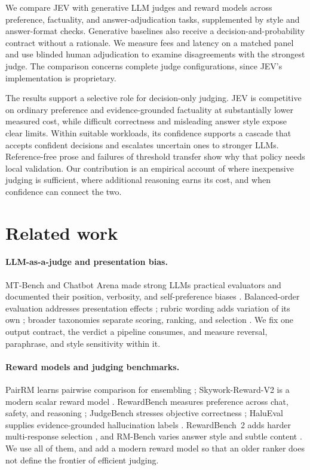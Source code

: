 \documentclass[11pt]{article}
\begin{document}
We compare JEV with generative LLM judges and reward models across preference, factuality, and answer-adjudication tasks, supplemented by style and answer-format checks. Generative baselines also receive a decision-and-probability contract without a rationale. We measure fees and latency on a matched panel and use blinded human adjudication to examine disagreements with the strongest judge. The comparison concerns complete judge configurations, since JEV's implementation is proprietary.

The results support a selective role for decision-only judging. JEV is competitive on ordinary preference and evidence-grounded factuality at substantially lower measured cost, while difficult correctness and misleading answer style expose clear limits. Within suitable workloads, its confidence supports a cascade that accepts confident decisions and escalates uncertain ones to stronger LLMs. Reference-free prose and failures of threshold transfer show why that policy needs local validation. Our contribution is an empirical account of where inexpensive judging is sufficient, where additional reasoning earns its cost, and when confidence can connect the two.

\section{Related work}
\paragraph{LLM-as-a-judge and presentation bias.}
MT-Bench and Chatbot Arena made strong LLMs practical evaluators and documented their position, verbosity, and self-preference biases \citep{zheng2023}. Balanced-order evaluation addresses presentation effects \citep{position}; rubric wording adds variation of its own \citep{rubrics}; broader taxonomies separate scoring, ranking, and selection \citep{survey}. We fix one output contract, the verdict a pipeline consumes, and measure reversal, paraphrase, and style sensitivity within it.

\paragraph{Reward models and judging benchmarks.}
PairRM learns pairwise comparison for ensembling \citep{pairrm}; Skywork-Reward-V2 is a modern scalar reward model \citep{skywork}. RewardBench measures preference across chat, safety, and reasoning \citep{rewardbench}; JudgeBench stresses objective correctness \citep{judgebench}; HaluEval supplies evidence-grounded hallucination labels \citep{halueval}. RewardBench~2 adds harder multi-response selection \citep{rewardbench2}, and RM-Bench varies answer style and subtle content \citep{rmbench}. We use all of them, and add a modern reward model so that an older ranker does not define the frontier of efficient judging.
\end{document}
